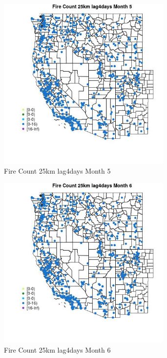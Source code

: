 \begin{figure} 
\centering  
\includegraphics[width=0.77\textwidth]{Code_Outputs/Report_ML_input_PM25_Step4_part_e_de_duplicated_aves_compiled_2019-05-21wNAs_MapObsMo5Fire_Count_25km_lag4days.jpg} 
\caption{\label{fig:Report_ML_input_PM25_Step4_part_e_de_duplicated_aves_compiled_2019-05-21wNAsMapObsMo5Fire_Count_25km_lag4days}Fire Count 25km lag4days Month 5} 
\end{figure} 
 

\clearpage 

\begin{figure} 
\centering  
\includegraphics[width=0.77\textwidth]{Code_Outputs/Report_ML_input_PM25_Step4_part_e_de_duplicated_aves_compiled_2019-05-21wNAs_MapObsMo6Fire_Count_25km_lag4days.jpg} 
\caption{\label{fig:Report_ML_input_PM25_Step4_part_e_de_duplicated_aves_compiled_2019-05-21wNAsMapObsMo6Fire_Count_25km_lag4days}Fire Count 25km lag4days Month 6} 
\end{figure} 
 


